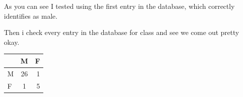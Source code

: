 \documentclass[pdftex,12pt,a4paper]{article}
\begin{document}
    	As you can see I tested using the first entry in the database, which correctly identifies as male.
    	
    	Then i check every entry in the database for class and see we come out pretty okay.
    	\begin{center}
  			\begin{tabular}{l | c | r | }
    			  & M  & F \\ \hline
    			M & 26 & 1 \\ \hline
    			F & 1  & 5 \\
    			\hline
  			\end{tabular}
		\end{center}
    	
    	
\end{document}
